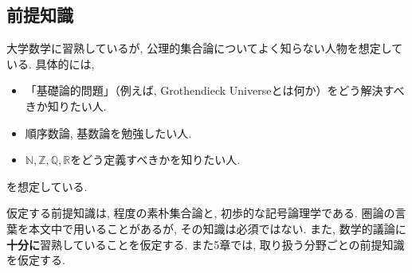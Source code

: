 \documentclass[a4paper, twoside]{bxjsarticle}
\newcommand{\nat}{\mathbb{N}}
\newcommand{\zah}{\mathbb{Z}}
\newcommand{\quo}{\mathbb{Q}}
\newcommand{\rea}{\mathbb{R}}
\theoremstyle{definition}
\begin{document}
        
        
        
    
    \subsection*{前提知識}
        大学数学に習熟しているが, 公理的集合論についてよく知らない人物を想定している. 具体的には,
        \begin{itemize}
            \item 「基礎論的問題」（例えば, Grothendieck Universeとは何か）をどう解決すべきか知りたい人.
            \item 順序数論, 基数論を勉強したい人.
            \item $\nat, \zah, \quo, \rea$をどう定義すべきかを知りたい人.
        \end{itemize}
        を想定している.
        
        仮定する前提知識は, \cite{matsuzaka}程度の素朴集合論と, 初歩的な記号論理学である. 圏論の言葉を本文中で用いることがあるが, その知識は必須ではない. また, 数学的議論に\textbf{十分に}習熟していることを仮定する. また5章では, 取り扱う分野ごとの前提知識を仮定する.
        
\end{document}
